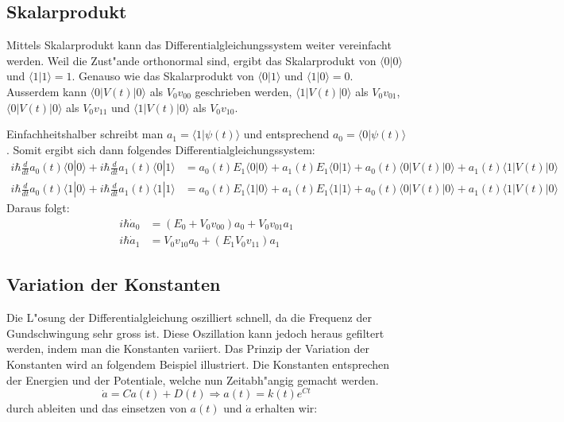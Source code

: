 \begin{refsection}
\subsection{Skalarprodukt}

Mittels Skalarprodukt kann das Differentialgleichungssystem weiter
vereinfacht werden.
Weil die Zust"ande orthonormal sind, ergibt das Skalarprodukt von $\langle0|0\rangle$
und $\langle1|1\rangle = 1$.
Genauso wie das Skalarprodukt von $\langle0|1\rangle$ und
$\langle1|0\rangle = 0$.
Ausserdem kann  $\langle0|V(t)|0\rangle$ als $V_{0}v_{00}$ geschrieben
werden, $\langle1|V(t)|0\rangle$ als $V_{0}v_{01}$,$\langle0|V(t)|0\rangle$
als $V_{0}v_{11}$ und $\langle1|V(t)|0\rangle$ als $V_{0}v_{10}$.

Einfachheitshalber schreibt man $a_1 = \langle1|\psi(t)\rangle$ und
entsprechend $a_0 = \langle0|\psi(t)\rangle$.
Somit ergibt sich dann folgendes Differentialgleichungssystem:
\begin{align*}
i\hbar\frac{d}{dt}a_{0}(t)\langle0|0\rangle +i\hbar\frac{d}{dt}a_{1}(t)\langle0|1\rangle&= a_{0}(t)E_{1}\langle0|0\rangle + a_{1}(t)E_{1}\langle0|1\rangle + a_{0}(t)\langle0|V(t)|0\rangle+ a_{1}(t)\langle1|V(t)|0\rangle
\\
i\hbar\frac{d}{dt}a_{0}(t)\langle1|0\rangle +i\hbar\frac{d}{dt}a_{1}(t)\langle1|1\rangle&= a_{0}(t)E_{1}\langle1|0\rangle + a_{1}(t)E_{1}\langle1|1\rangle + a_{0}(t)\langle0|V(t)|0\rangle+ a_{1}(t)\langle1|V(t)|0\rangle
\end{align*}
Daraus folgt:
\begin{align}
i\hbar\dot{a}_0&= (E_{0} + V_{0} v_{00}) a_{0} + V_{0} v_{01} a_{1}
\\
i\hbar\dot{a}_1&= V_{0} v_{10} a_{0} + (E_{1} V_{0} v_{11}) a_{1}
\end{align}

\subsection{Variation der Konstanten}
Die L"osung der Differentialgleichung oszilliert schnell, da die
Frequenz der Gundschwingung sehr gross ist.
Diese Oszillation kann jedoch heraus gefiltert werden, indem man die
Konstanten variiert.
Das Prinzip der Variation der Konstanten wird an folgendem Beispiel
illustriert.
Die Konstanten entsprechen der Energien und der Potentiale, welche nun
Zeitabh"angig gemacht werden.
\[
\dot{a} = C a(t) + D(t) \Rightarrow a(t) = k(t) e^{C t}
\] 
durch ableiten und das einsetzen von $ a(t)$ und  $ \dot{a} $ erhalten wir:


\end{refsection}
